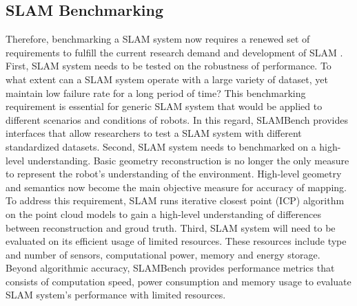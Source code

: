 \subsection{SLAM Benchmarking}
Therefore, benchmarking a SLAM system now requires a renewed set of requirements to fulfill the current research demand and development of SLAM \cite{cadena2016past}.
First, SLAM system needs to be tested on the robustness of performance. To what extent can a SLAM system operate with a large variety of dataset, yet maintain low failure rate for a long period of time? 
This benchmarking requirement is essential for generic SLAM system that would be applied to different scenarios and conditions of robots. 
In this regard, SLAMBench provides interfaces that allow researchers to test a SLAM system with different standardized datasets. 
Second, SLAM system needs to benchmarked on a high-level understanding. 
Basic geometry reconstruction is no longer the only measure to represent the robot’s understanding of the environment. 
High-level geometry and semantics now become the main objective measure for accuracy of mapping. 
To address this requirement, SLAM runs iterative closest point (ICP) algorithm on the point cloud models to gain a high-level understanding of differences between reconstruction and groud truth. 
Third, SLAM system will need to be evaluated on its efficient usage of limited resources. 
These resources include type and number of sensors, computational power, memory and energy storage. 
Beyond algorithmic accuracy, SLAMBench provides performance metrics that consists of computation speed, power consumption and memory usage to evaluate SLAM system’s performance with limited resources. 

